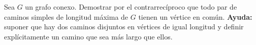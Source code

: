 


\item\Obligatorio Sea $G$ un grafo conexo.  Demostrar por el contrarrecíproco que todo par de caminos simples de longitud máxima de $G$ tienen un vértice en común.  \textbf{Ayuda:} suponer que hay dos caminos disjuntos en vértices de igual longitud y definir explícitamente un camino que sea más largo que ellos.


